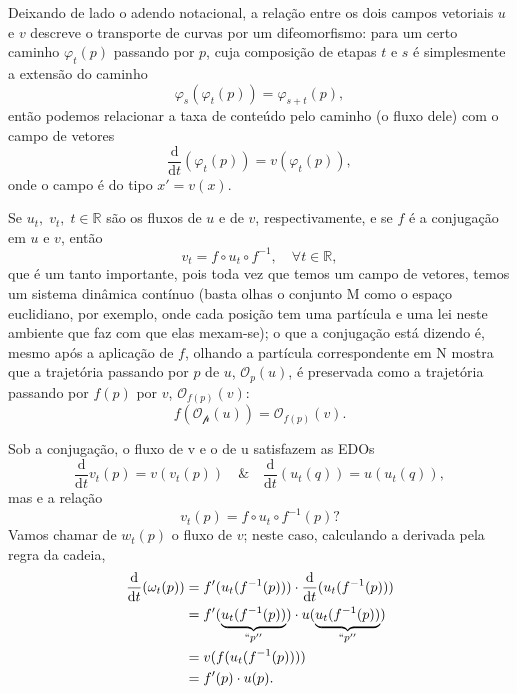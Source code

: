 \documentclass[../differential_topology.tex]{subfiles}
\begin{document}
Deixando de lado o adendo notacional, a relação entre os dois campos vetoriais \(u\) e \(v\) descreve o transporte de curvas por um difeomorfismo: para um certo caminho \(\varphi _{t}(p)\) passando por \(p\), cuja composição de etapas \(t\) e \(s\) é simplesmente a extensão do caminho
\[
	\varphi _{s}(\varphi _{t}(p)) = \varphi _{s+t}(p),
\]
então podemos relacionar a taxa de conteúdo pelo caminho (o fluxo dele) com o campo de vetores
\[
	\frac{\mathrm{d}}{\mathrm{d}t}(\varphi_{t}(p)) = v(\varphi_{t}(p)),
\]
onde o campo é do tipo \(x'= v(x).\)
\begin{tcolorbox}[
		skin=enhanced,
		title=Observação,
		fonttitle=\bfseries,
		colframe=black,
		colbacktitle=cyan!75!white,
		colback=cyan!15,
		colbacklower=black,
		coltitle=black,
		drop fuzzy shadow,
	]
	Se \(u_{t},\; v_{t},\; t\in \mathbb{R}\) são os fluxos de \(u\) e de \(v\), respectivamente, e se \(f\) é a conjugação em \(u\) e \(v\), então
	\[
		v_{t} = f\circ u_{t}\circ f^{-1}, \quad \forall t\in \mathbb{R},
	\]
	que é um tanto importante, pois toda vez que temos um campo de vetores, temos um sistema dinâmica contínuo (basta olhas o conjunto M como o espaço euclidiano, por exemplo, onde cada posição tem uma partícula e uma lei neste ambiente que faz com que elas mexam-se); o que a conjugação está dizendo é, mesmo após a aplicação de \(f\), olhando a partícula correspondente em N mostra que a trajetória passando por \(p\) de \(u\), \(\mathcal{O}_{p}(u)\), é preservada como a trajetória passando por \(f(p)\) por \(v\), \(\mathcal{O}_{f(p)}(v)\):
	\[
		f(\mathcal{O_{p}}(u)) = \mathcal{O}_{f(p)}(v).
	\]
\end{tcolorbox}
Sob a conjugação, o fluxo de v e o de u satisfazem as EDOs
\[
	\frac{\mathrm{d}}{\mathrm{d}t}v_{t}(p) = v(v_{t}(p)) \quad\&\quad \frac{\mathrm{d}}{\mathrm{d}t}(u_{t}(q)) = u(u_{t}(q)),
\]
mas e a relação
\[
	v_{t}(p) = f\circ u_{t}\circ f^{-1}(p)?
\]
Vamos chamar de \(w_{t}(p)\) o fluxo de \(v\); neste caso, calculando a derivada pela regra da cadeia,
\begin{align*}
	\frac{\mathrm{d}}{\mathrm{d}t}(\omega_{t}(p)) & = f'(u_{t}(f^{-1}(p)))\cdot \frac{\mathrm{d}}{\mathrm{d}t} (u_{t}(f^{-1}(p)))             \\
	                                              & = f'(\underbrace{u_{t}(f^{-1}(p))}_{``p''})\cdot u(\underbrace{u_{t}(f^{-1}(p))}_{``p''}) \\
	                                              & = v(f(u_{t}(f^{-1}(p))))                                                                  \\
	                                              & = f'(p)\cdot u(p).
\end{align*}
\end{document}
